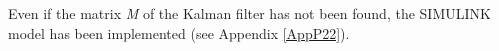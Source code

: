 Even if the matrix \emph{M} of the Kalman filter has not been found, the SIMULINK model has been implemented (see Appendix \ref{AppP22}).